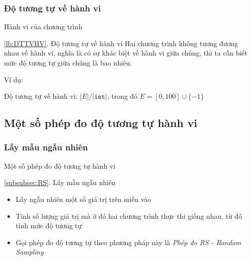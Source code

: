 \subsubsection*{Độ tương tự về hành vi}
\label{lb:DTTVHV}
\begin{frame}{Hành vi của chương trình}
\begin{block}{\ref{lb:DTTVHV}. Độ tương tự về hành vi}
Hai chương trình không tương đương nhau về hành vi, nghĩa là có sự 
khác biệt về hành vi giữa chúng, thì ta cần biết mức độ tương tự 
giữa chúng là bao nhiêu.
\end{block}
\begin{exampleblock}{Ví dụ:}
	\begin{minipage}[t]{0.45\linewidth}
		
	\end{minipage}%
	\hfill\vrule\hfill
	\begin{minipage}[t]{0.45\linewidth}
		
	\end{minipage}%
\end{exampleblock}
Độ tương tự về hành vi: $|E| / |\texttt{int}|$, trong đó $E = [0,100] \cup \{-1\}$
\end{frame}

\subsection{Một số phép đo độ tương tự hành vi}
\label{subsec:MSPD}
\subsubsection*{Lẫy mẫu ngẫu nhiên}
\label{subsubsec:RS}
\begin{frame}{Một số phép đo độ tương tự hành vi}
\begin{block}{\ref{subsubsec:RS}. Lấy mẫu ngẫu nhiên}
\begin{itemize}
\item Lấy ngẫu nhiên một số giá trị trên miền vào
\item Tính số lượng giá trị mà ở đó hai chương trình thực thi giống nhau, 
từ đó tính mức độ tương tự
\item Gọi phép đo độ tương tự theo phương pháp này là \emph{Phép đo RS - Random Sampling}
\end{itemize}
\end{block}
\pause
\end{frame}

